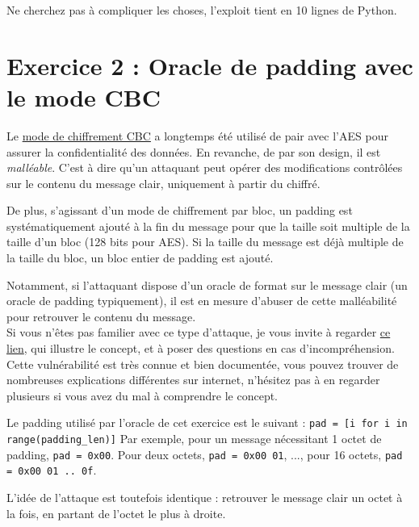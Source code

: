 \documentclass[french,a4paper,11pt]{exam}
\begin{document}
	\noindent Ne cherchez pas à compliquer les choses, l'exploit tient en 10 lignes de Python.
	
	\section*{Exercice 2 : Oracle de padding avec le mode CBC}
	
	Le \href{https://en.wikipedia.org/wiki/Block_cipher_mode_of_operation#Cipher_block_chaining_(CBC)}{mode de chiffrement CBC} a longtemps été utilisé de pair avec l'AES pour assurer la confidentialité des données. En revanche, de par son design, il est \emph{malléable}. C'est à dire qu'un attaquant peut opérer des modifications contrôlées sur le contenu du message clair, uniquement à partir du chiffré.

	De plus, s'agissant d'un mode de chiffrement par bloc, un padding est systématiquement ajouté à la fin du message pour que la taille soit multiple de la taille d'un bloc (128 bits pour AES). Si la taille du message est déjà multiple de la taille du bloc, un bloc entier de padding est ajouté.

	Notamment, si l'attaquant dispose d'un oracle de format sur le message clair (un oracle de padding typiquement), il est en mesure d'abuser de cette malléabilité pour retrouver le contenu du message. \\
	Si vous n'êtes pas familier avec ce type d'attaque, je vous invite à regarder \href{https://dylanpindur.com/blog/padding-oracles-an-animated-primer/}{ce lien}, qui illustre le concept, et à poser des questions en cas d'incompréhension. Cette vulnérabilité est très connue et bien documentée, vous pouvez trouver de nombreuses explications différentes sur internet, n'hésitez pas à en regarder plusieurs si vous avez du mal à comprendre le concept.

	\begin{center}
	\end{center}

	\noindent Le padding utilisé par l'oracle de cet exercice est le suivant : 
	\texttt{pad = [i for i in range(padding\_len)]}
	Par exemple, pour un message nécessitant 1 octet de padding, \texttt{pad = 0x00}. Pour deux octets, \texttt{pad = 0x00 01}, ..., pour 16 octets, \texttt{pad = 0x00 01 .. 0f}.

	L'idée de l'attaque est toutefois identique : retrouver le message clair un octet à la fois, en partant de l'octet le plus à droite.
	
\end{document}
